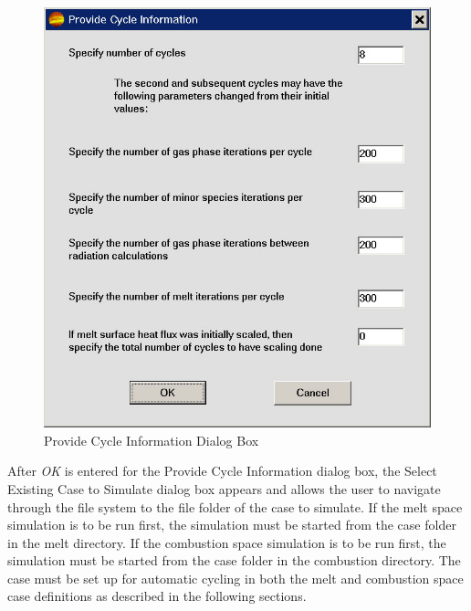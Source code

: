 \documentclass[12pt]{article}
\newcommand{\parm}[1]{\textit{#1}}
\newcommand{\dialog}[1]{\textsf{#1}}
\numberwithin{equation}{section}
\begin{document}
\begin{figure}
\centering
\includegraphics{figs/cycleBox.jpg}
\caption{Provide Cycle Information Dialog Box}
\label{PCI-dialog}
\end{figure}
\noindent
After \parm{OK} is entered for the \dialog{Provide Cycle Information} dialog box, the \dialog{Select Existing Case to Simulate} dialog box appears and allows the user to navigate through the file system to the file folder of the case to simulate. If the melt space simulation is to be run first, the simulation must be started from the case folder in the melt directory. If the combustion space simulation is to be run first, the simulation must be started from the case folder in the combustion directory. The case must be set up for automatic cycling in both the melt and combustion space case definitions as described in the following sections.\\
\\
\end{document}
